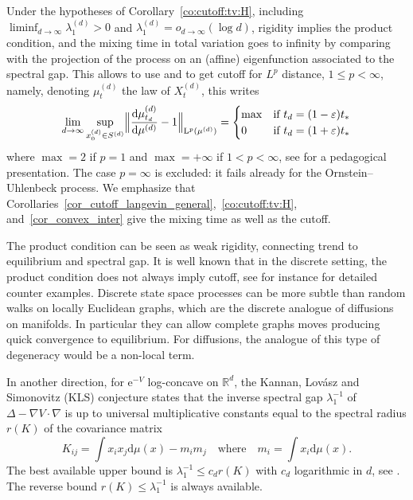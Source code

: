 \documentclass[10pt,reqno]{amsart}
\numberwithin{equation}{section}
\begin{document}
Under the hypotheses of Corollary~\ref{co:cutoff:tv:H}, including
$\liminf_{d\to\infty}\lambda_1^{(d)}>0$ and
$\lambda_1^{(d)}=o_{d\to\infty}(\log d)$, rigidity implies the product
condition, and the mixing time in total variation goes to
infinity by comparing with the projection of the process on an (affine)
eigenfunction associated to the spectral gap. This allows to use
\cite[Th.~3.3]{MR2375599} and \cite[Cor.~1]{salez-2025} to get cutoff for
$L^p$ distance, $1\leq p<\infty$, namely, denoting $\mu^{(d)}_t$ the law of
$X^{(d)}_t$, this writes
\begin{equation}\label{eq:Lp}
    \lim_{d\to\infty}
    \sup_{x^{(d)}_0\in S^{(d)}}
    \Bigl\|\frac{\mathrm{d}\mu^{(d)}_{t_d}}{\mathrm{d}\mu^{(d)}}-1\Bigr\|_{\mathrm{L}^p(\mu^{(d)})}
    =
    \begin{cases}
      \max & \text{if $t_d=(1-\varepsilon)t_*$}\\
      0 & \text{if $t_d=(1+\varepsilon)t_*$}
    \end{cases}
\end{equation}
where $\max=2$ if $p=1$ and $\max=+\infty$ if $1<p<\infty$, see \cite{blog-saloff}
for a pedagogical presentation. The case $p=\infty$ is excluded: it fails already for the Ornstein--Uhlenbeck process. We emphasize that
Corollaries~\ref{cor_cutoff_langevin_general},~\ref{co:cutoff:tv:H},
and~\ref{cor_convex_inter} give the mixing time as well as the cutoff.

The product condition can be seen as weak rigidity, connecting trend to equilibrium and spectral gap. 
It is well known that in the discrete setting, the product condition does not always imply cutoff, see for instance \cite{MR2375599} for detailed counter examples. Discrete state space processes can be more subtle than random walks on locally Euclidean graphs, which are the discrete analogue of diffusions on manifolds. In particular they can allow complete graphs moves producing quick convergence to equilibrium. For diffusions, the analogue of this type of degeneracy would be a non-local term. 

In another direction, for $\mathrm{e}^{-V}$ log-concave on $\mathbb{R}^d$, the
Kannan, Lovász and Simonovitz (KLS) conjecture states that the inverse
spectral gap $\lambda_1^{-1}$ of $\Delta-\nabla V\cdot\nabla$ is up to
universal multiplicative constants equal to the spectral radius $r(K)$ of the
covariance matrix
\[
K_{ij}=\int x_ix_j\mathrm{d}\mu(x)-m_im_j
\quad\text{where}\quad
m_i=\int x_i\mathrm{d}\mu(x).
\]
The best available upper bound is $\lambda_1^{-1}\leq c_d r(K)$ with $c_d$
logarithmic in $d$, see \cite{klartag}. The reverse bound
$r(K)\leq\lambda_1^{-1}$ is always available.
\end{document}
